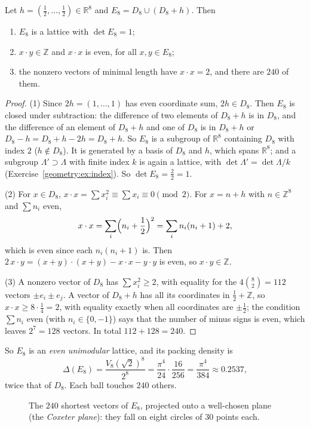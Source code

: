 \begin{theorem}\label{geometry:thm:e8}
Let $h=(\frac12,\dots,\frac12)\in\mathbb R^8$ and $E_8=D_8\cup(D_8+h)$. Then
\begin{enumerate}
\item $E_8$ is a lattice with $\det E_8=1$;
\item $x\cdot y\in\mathbb Z$ and $x\cdot x$ is even, for all $x,y\in E_8$;
\item the nonzero vectors of minimal length have $x\cdot x=2$, and there are $240$ of them.
\end{enumerate}
\end{theorem}

\begin{proof}
(1) Since $2h=(1,\dots,1)$ has even coordinate sum, $2h\in D_8$. Then $E_8$ is closed under subtraction: the difference of two elements of $D_8+h$ is in $D_8$,
and the difference of an element of $D_8+h$ and one of $D_8$ is in $D_8+h$ or $D_8-h=D_8+h-2h=D_8+h$. So $E_8$ is a subgroup of $\mathbb R^8$ containing
$D_8$ with index $2$ ($h\notin D_8$). It is generated by a basis of $D_8$ and $h$, which spans $\mathbb R^8$; and a subgroup $\Lambda'\supset\Lambda$ with
finite index $k$ is again a lattice, with $\det\Lambda'=\det\Lambda/k$ (Exercise~\ref{geometry:ex:index}). So $\det E_8=\frac22=1$.

(2) For $x\in D_8$, $x\cdot x=\sum x_i^2\equiv\sum x_i\equiv0\pmod2$. For $x=n+h$ with $n\in\mathbb Z^8$ and $\sum n_i$ even,
\[
x\cdot x=\sum_i\Bigl(n_i+\frac12\Bigr)^2=\sum_in_i(n_i+1)+2,
\]
which is even since each $n_i(n_i+1)$ is. Then $2\,x\cdot y=(x+y)\cdot(x+y)-x\cdot x-y\cdot y$ is even, so $x\cdot y\in\mathbb Z$.

(3) A nonzero vector of $D_8$ has $\sum x_i^2\ge2$, with equality for the $4\binom82=112$ vectors $\pm e_i\pm e_j$. A vector of $D_8+h$ has all its coordinates
in $\frac12+\mathbb Z$, so $x\cdot x\ge8\cdot\frac14=2$, with equality exactly when all coordinates are $\pm\frac12$; the condition $\sum n_i$ even (with
$n_i\in\{0,-1\}$) says that the number of minus signs is even, which leaves $2^7=128$ vectors. In total $112+128=240$.
\end{proof}

So $E_8$ is an \emph{even unimodular} lattice, and its packing density is
\[
\Delta(E_8)=\frac{V_8(\sqrt2)^8}{2^8}=\frac{\pi^4}{24}\cdot\frac{16}{256}=\frac{\pi^4}{384}\approx0.2537,
\]
twice that of $D_8$. Each ball touches $240$ others.

\begin{figure}[ht]
\centering
{}
\caption{The $240$ shortest vectors of $E_8$, projected onto a well-chosen plane (the \emph{Coxeter plane}): they fall on eight circles of $30$ points each.}
\label{geometry:fig:e8}
\end{figure}

